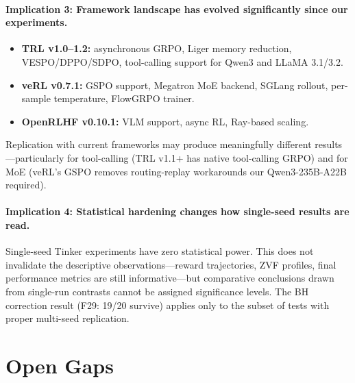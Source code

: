 \documentclass[12pt,a4paper]{report}
\theoremstyle{definition}
\begin{document}
\paragraph{Implication 3: Framework landscape has evolved significantly since our experiments.}
\begin{itemize}[nosep]
\item \textbf{TRL v1.0--1.2:} asynchronous GRPO, Liger memory reduction, VESPO/DPPO/SDPO, tool-calling
      support for Qwen3 and LLaMA 3.1/3.2.
\item \textbf{veRL v0.7.1:} GSPO support, Megatron MoE backend, SGLang rollout, per-sample temperature,
      FlowGRPO trainer.
\item \textbf{OpenRLHF v0.10.1:} VLM support, async RL, Ray-based scaling.
\end{itemize}
Replication with current frameworks may produce meaningfully different results---particularly for
tool-calling (TRL v1.1+ has native tool-calling GRPO) and for MoE (veRL's GSPO removes routing-replay
workarounds our Qwen3-235B-A22B required).

\paragraph{Implication 4: Statistical hardening changes how single-seed results are read.}
Single-seed Tinker experiments have zero statistical power. This does not invalidate the descriptive
observations---reward trajectories, ZVF profiles, final performance metrics are still informative---but
comparative conclusions drawn from single-run contrasts cannot be assigned significance levels. The BH
correction result (F29: 19/20 survive) applies only to the subset of tests with proper multi-seed
replication.

\section{Open Gaps}
\label{sec:open-gaps}
\end{document}
